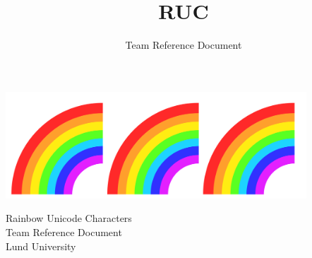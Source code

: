\documentclass[8pt,a4paper,landscape,oneside]{amsart}
\title{RUC}
\subtitle{Team Reference Document}
\date{\ddmmyyyydate{\today{}}}
\begin{document}
\thispagestyle{fancy}
\begin{titlingpage} %
\begin{center}
  \includegraphics[height=4cm]{rainbows.png}\\
  \begin{Large}
    Rainbow Unicode Characters \\
    Team Reference Document \\
    Lund University

  \end{Large}
\end{center}

\begin{multicols*}{2}
\vspace{-3em}
\tableofcontents
\end{multicols*}
\end{titlingpage}
\end{document}
